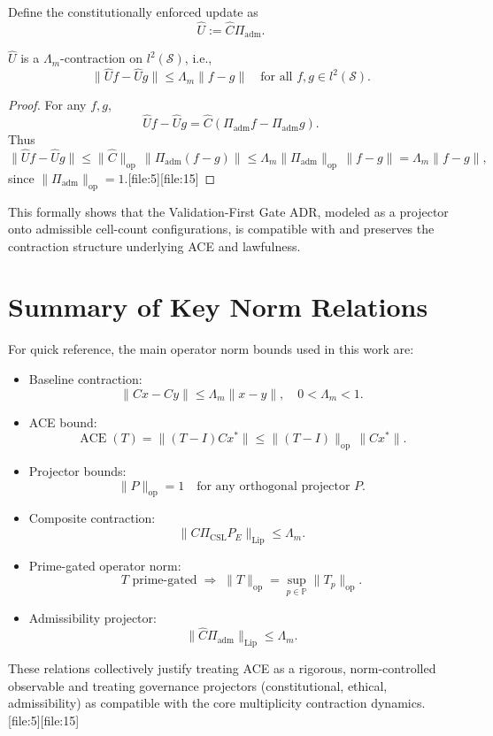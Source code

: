 \documentclass[11pt]{article}
\begin{document}
Define the constitutionally enforced update as
\[
\widehat{U} := \widehat{C} \Pi_{\mathrm{adm}}.
\]

\begin{proposition}
\(\widehat{U}\) is a \(\Lambda_m\)-contraction on \(l^2(\mathcal{S})\), i.e.,
\[
\|\widehat{U}f - \widehat{U}g\| \le \Lambda_m \|f-g\| \quad \text{for all } f,g\in l^2(\mathcal{S}).
\]
\end{proposition}

\begin{proof}
For any \(f,g\),
\[
\widehat{U}f - \widehat{U}g = \widehat{C}(\Pi_{\mathrm{adm}}f - \Pi_{\mathrm{adm}}g).
\]
Thus
\[
\|\widehat{U}f - \widehat{U}g\| \le \|\widehat{C}\|_{\mathrm{op}} \,\|\Pi_{\mathrm{adm}}(f-g)\|
\le \Lambda_m \|\Pi_{\mathrm{adm}}\|_{\mathrm{op}} \,\|f-g\|
= \Lambda_m \|f-g\|,
\]
since \(\|\Pi_{\mathrm{adm}}\|_{\mathrm{op}}=1\).[file:5][file:15]
\end{proof}

This formally shows that the Validation-First Gate ADR, modeled as a projector onto admissible cell-count configurations, is compatible with and preserves the contraction structure underlying ACE and lawfulness.

\section{Summary of Key Norm Relations}

For quick reference, the main operator norm bounds used in this work are:

\begin{itemize}
  \item Baseline contraction:
  \[
  \|Cx - Cy\| \le \Lambda_m \|x-y\|,\quad 0<\Lambda_m<1.
  \]
  \item ACE bound:
  \[
  \operatorname{ACE}(T) = \|(T-I)Cx^\ast\| \le \|(T-I)\|_{\mathrm{op}} \,\|Cx^\ast\|.
  \]
  \item Projector bounds:
  \[
  \|P\|_{\mathrm{op}}=1 \quad\text{for any orthogonal projector }P.
  \]
  \item Composite contraction:
  \[
  \|C\Pi_{\mathrm{CSL}} P_E\|_{\mathrm{Lip}} \le \Lambda_m.
  \]
  \item Prime-gated operator norm:
  \[
  T \text{ prime-gated} \;\Rightarrow\; \|T\|_{\mathrm{op}} = \sup_{p\in\mathbb{P}} \|T_p\|_{\mathrm{op}}.
  \]
  \item Admissibility projector:
  \[
  \|\widehat{C}\Pi_{\mathrm{adm}}\|_{\mathrm{Lip}} \le \Lambda_m.
  \]
\end{itemize}

These relations collectively justify treating ACE as a rigorous, norm-controlled observable and treating governance projectors (constitutional, ethical, admissibility) as compatible with the core multiplicity contraction dynamics.[file:5][file:15]


\nocite{*}
  

\end{document}
